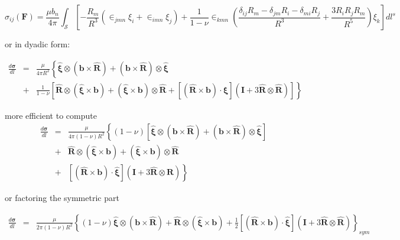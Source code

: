\begin{equation}
\sigma_{ij}(\bm F)=\frac{\mu b_n}{4\pi}\int_\mathcal{S} \left[-\frac{R_m}{R^3}\left(\in_{jmn}\xi_i+\in_{imn}\xi_j\right)+\frac{1}{1-\nu}\in_{kmn}\left(\frac{\delta_{ij}R_m-\delta_{jm}R_i-\delta_{mi}R_j}{R^3}+\frac{3R_iR_jR_m}{R^5}\right)\xi_k\right]dl^s
\end{equation}




or in dyadic form:

\begin{eqnarray}
\frac{d\bm \sigma}{dl}&=&\frac{\mu}{4\pi R^2}\left\{\hat{\bm\xi}\otimes(\bm b\times \hat{\bm R})+(\bm b\times \hat{\bm R})\otimes\hat{\bm\xi}\right.\nonumber\\
&+&\left.\frac{1}{1-\nu}\left[\hat{\bm R}\otimes(\hat{\bm\xi}\times\bm b)+(\hat{\bm\xi}\times\bm b)\otimes\hat{\bm R}
+ \left[(\hat{\bm R}\times\bm b)\cdot\hat{\bm\xi}\right]\left(\bm I + 3\hat{\bm R}\otimes\hat{\bm R} \right)\right]\right\}
\end{eqnarray}

more efficient to compute
\begin{eqnarray}
\frac{d\bm \sigma}{dl}&=&\frac{\mu}{4\pi (1-\nu)R^2}\left\{(1-\nu)\left[\hat{\bm\xi}\otimes(\bm b\times \hat{\bm R})+(\bm b\times \hat{\bm R})\otimes\hat{\bm\xi}\right]\right.\nonumber\\
&+&\left.\hat{\bm R}\otimes(\hat{\bm\xi}\times\bm b)+(\hat{\bm\xi}\times\bm b)\otimes\hat{\bm R}\right.\nonumber\\
&+&\left. \left[(\hat{\bm R}\times\bm b)\cdot\hat{\bm\xi}\right]\left(\bm I + 3\hat{\bm R}\otimes\hat{\bm R} \right)\right\}
\end{eqnarray}



or factoring the symmetric part

\begin{eqnarray}
\frac{d\bm \sigma}{dl}&=&\frac{\mu}{2\pi (1-\nu)R^2}\left\{(1-\nu)\hat{\bm\xi}\otimes(\bm b\times \hat{\bm R})
+\hat{\bm R}\otimes(\hat{\bm\xi}\times\bm b)
+\frac{1}{2}\left[(\hat{\bm R}\times\bm b)\cdot\hat{\bm\xi}\right]\left(\bm I + 3\hat{\bm R}\otimes\hat{\bm R} \right)\right\}_{sym}
\end{eqnarray}

